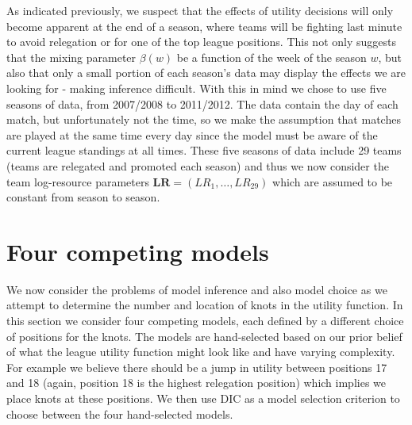 As indicated previously, we suspect that the effects of utility decisions will only become apparent at the end of a
season, where teams will be fighting last minute to avoid relegation or for one of the top league positions. This not
only suggests that the mixing parameter \(\beta(w)\) be a function of the week of the season \(w\), but also that only a
small portion of each season's data may display the effects we are looking for - making inference difficult. With this
in mind we chose to use five seasons of data, from 2007/2008 to 2011/2012. The data contain the day of each match, but
unfortunately not the time, so we make the assumption that matches are played at the same time every day since the model
must be aware of the current league standings at all times. These five seasons of data include 29 teams (teams are
relegated and promoted each season) and thus we now consider the team log-resource parameters \(\mathbf{LR} = (LR_1,
\ldots, LR_{29})\) which are assumed to be constant from season to season.

\section{Four competing models}
\label{sec:Four_competing_models}

We now consider the problems of model inference and also model choice as we attempt to determine the number and location
of knots in the utility function. In this section we consider four competing models, each defined by a different choice
of positions for the knots. The models are hand-selected based on our prior belief of what the league utility function
might look like and have varying complexity. For example we believe there should be a jump in utility between positions
17 and 18 (again, position 18 is the highest relegation position) which implies we place knots at these positions. We
then use \gls{DIC} as a model selection criterion to choose between the four hand-selected models.

